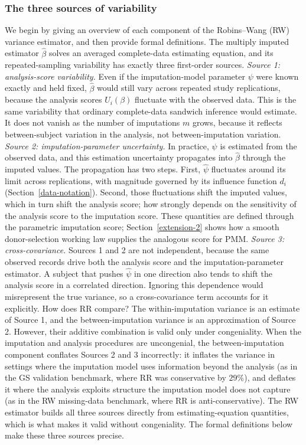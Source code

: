 \subsubsection{The three sources of variability}
We begin by giving an overview of each component of the Robins--Wang
(RW) variance estimator, and then provide formal definitions.  The
multiply imputed estimator \(\hat\beta\) solves an averaged
complete-data estimating equation, and its repeated-sampling
variability has exactly three first-order sources.
\emph{Source 1: analysis-score variability.}  Even if the
imputation-model parameter \(\psi\) were known exactly and held fixed,
\(\hat\beta\) would still vary across repeated study replications,
because the analysis scores \(U_i(\beta)\) fluctuate with the observed
data.  This is the same variability that ordinary complete-data
sandwich inference would estimate.  It does not vanish as the number of
imputations \(m\) grows, because it reflects between-subject variation
in the analysis, not between-imputation variation.
\emph{Source 2: imputation-parameter uncertainty.}  In practice,
\(\psi\) is estimated from the observed data, and this estimation
uncertainty propagates into \(\hat\beta\) through the imputed values.
The propagation has two steps.  First, \(\hat\psi\) fluctuates around
its limit across replications, with magnitude governed by its influence
function \(d_i\) (Section~\ref{data-notation}).  Second, those
fluctuations shift the imputed values, which in turn shift the analysis
score; how strongly depends on the sensitivity of the analysis score to
the imputation score.  These quantities are defined through the
parametric imputation score; Section~\ref{extension-2} shows how a
smooth donor-selection working law supplies the analogous score for
PMM.
\emph{Source 3: cross-covariance.}  Sources 1 and 2 are not
independent, because the same observed records drive both the analysis
score and the imputation-parameter estimator.  A subject that pushes
\(\hat\psi\) in one direction also tends to shift the analysis score in
a correlated direction.  Ignoring this dependence would misrepresent
the true variance, so a cross-covariance term accounts for it
explicitly.
How does RR compare?  The within-imputation variance is an
estimate of Source 1, and the between-imputation variance is an
approximation of Source 2.  However, their additive combination is
valid only under congeniality.  When the imputation and analysis
procedures are uncongenial, the between-imputation component conflates
Sources 2 and 3 incorrectly: it inflates the variance in settings where
the imputation model uses information beyond the analysis (as in the GS
validation benchmark, where RR was conservative by \(29\%\)), and
deflates it where the analysis exploits structure the imputation model
does not capture (as in the RW missing-data benchmark, where RR is
anti-conservative).  The RW estimator builds all three sources directly
from estimating-equation quantities, which is what makes it valid
without congeniality.  The formal definitions below make these three
sources precise.
